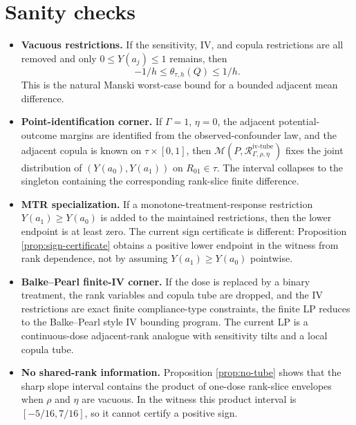 \documentclass[11pt]{article}
\theoremstyle{definition}
\theoremstyle{plain}
\theoremstyle{remark}
\begin{document}
\section{Sanity checks}
\begin{itemize}[leftmargin=*]
\item \textbf{Vacuous restrictions.}  If the sensitivity, IV, and copula restrictions are all removed and only \(0\le Y(a_j)\le1\) remains, then
\[
-1/h\le \theta_{\tau,h}(Q)\le 1/h.
\]
This is the natural Manski worst-case bound for a bounded adjacent mean difference.

\item \textbf{Point-identification corner.}  If \(\Gamma=1\), \(\eta=0\), the adjacent potential-outcome margins are identified from the observed-confounder law, and the adjacent copula is known on \(\tau\times[0,1]\), then \(\mathcal M(P,\mathcal R_{\Gamma,\rho,\eta}^{\mathrm{iv\text{-}tube}})\) fixes the joint distribution of \((Y(a_0),Y(a_1))\) on \(R_{01}\in\tau\).  The interval collapses to the singleton containing the corresponding rank-slice finite difference.

\item \textbf{MTR specialization.}  If a monotone-treatment-response restriction \(Y(a_1)\ge Y(a_0)\) is added to the maintained restrictions, then the lower endpoint is at least zero.  The current sign certificate is different: Proposition \ref{prop:sign-certificate} obtains a positive lower endpoint in the witness from rank dependence, not by assuming \(Y(a_1)\ge Y(a_0)\) pointwise.

\item \textbf{Balke--Pearl finite-IV corner.}  If the dose is replaced by a binary treatment, the rank variables and copula tube are dropped, and the IV restrictions are exact finite compliance-type constraints, the finite LP reduces to the Balke--Pearl style IV bounding program.  The current LP is a continuous-dose adjacent-rank analogue with sensitivity tilts and a local copula tube.

\item \textbf{No shared-rank information.}  Proposition \ref{prop:no-tube} shows that the sharp slope interval contains the product of one-dose rank-slice envelopes when \(\rho\) and \(\eta\) are vacuous.  In the witness this product interval is \([-5/16,7/16]\), so it cannot certify a positive sign.
\end{itemize}
\end{document}
